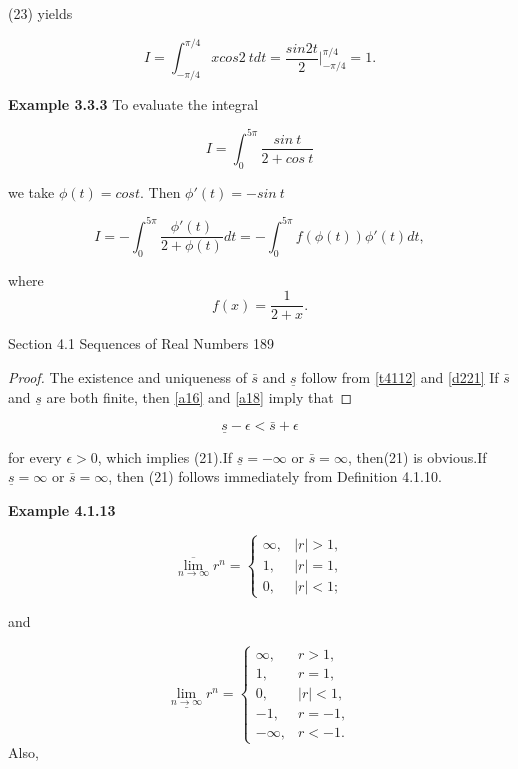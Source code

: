 \begin{flushleft}
(23) yields 


$$
I  =  \int_{-\pi/4}^{\pi/4} x  cos2\ tdt = \frac{sin2t}{2} \bigg|_{-\pi/4}^{\pi/4} =1.
$$



\textbf{Example 3.3.3} To evaluate the integral

$$
I  =  \int_{0}^{5\pi}   \frac{sin\ t }{2 + cos \ t } 
$$
 
 we take $\phi (t) = cost.$ Then $\phi' (t) = -sin \ t $



$$
I  =  -\int_{0}^{5\pi}   \frac{\phi'(t) }{2 + \phi(t) } dt =  - \int_{0}^{5\pi}f(\phi(t)) \phi'(t)dt , 
$$


where 
$$
f(x) = \frac{1}{2+x}.
$$



\newpage
\begin{flushright}
Section 4.1 Sequences of Real Numbers 189
\end{flushright}

\begin{proof}
 The existence and uniqueness of $\bar{s}$ and  $\underline{s}$  follow from \ref{t4112} and \ref{d221} If $\bar{s}$  and $\underline{s}$ are both finite, then \ref{a16} and \ref{a18} imply that
\end{proof}

$$
\underline{s} - \epsilon  < \bar{s} + \epsilon
$$

for every $\epsilon > 0 $, which implies (21).If $\underline{s} = - \infty $ or $\bar{s} = \infty $, then(21) is obvious.If $\underline{s} = \infty $ or  $\bar{s} = \infty $, then (21) follows immediately from Definition 4.1.10.


\textbf{Example 4.1.13}


$$
\overline{\lim_{n \rightarrow \infty }}  r^n = 
\begin{cases}
\infty , & |r|>1,\\
1, & |r|=1,\\
0, & |r|<1;
\end{cases} 
$$

and

$$
\underline{\lim_{n \rightarrow \infty }}  r^n =  
\begin{cases}
\infty , & r>1,\\
1, & r=1,\\
0, & |r|<1, \\
-1 ,& r= -1, \\
-\infty,& r<-1.
\end{cases} 
$$
Also,



\end{flushleft}
